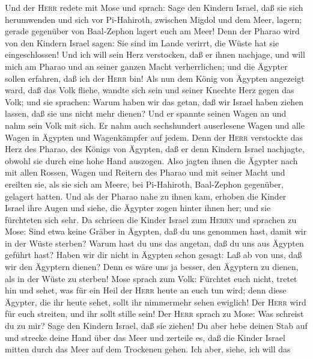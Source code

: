  Und der \textsc{Herr} redete mit Mose und sprach:
 Sage den Kindern Israel, daß sie sich herumwenden und
sich vor Pi-Hahiroth, zwischen Migdol und dem Meer, lagern; gerade
gegenüber von Baal-Zephon lagert euch am Meer!  Denn der
Pharao wird von den Kindern Israel sagen: Sie sind im Lande verirrt, die
Wüste hat sie eingeschlossen!  Und ich will sein Herz
verstocken, daß er ihnen nachjage, und will mich am Pharao und an seiner
ganzen Macht verherrlichen; und die Ägypter sollen erfahren, daß ich der
\textsc{Herr} bin!  Als nun dem König von Ägypten
angezeigt ward, daß das Volk fliehe, wandte sich sein und seiner Knechte
Herz gegen das Volk; und sie sprachen: Warum haben wir das getan, daß
wir Israel haben ziehen lassen, daß sie uns nicht mehr dienen?
 Und er spannte seinen Wagen an und nahm sein Volk mit
sich.  Er nahm auch sechshundert auserlesene Wagen und
alle Wagen in Ägypten und Wagenkämpfer auf jedem.  Denn
der \textsc{Herr} verstockte das Herz des Pharao, des Königs von
Ägypten, daß er denn Kindern Israel nachjagte, obwohl sie durch eine
hohe Hand auszogen.  Also jagten ihnen die Ägypter nach
mit allen Rossen, Wagen und Reitern des Pharao und mit seiner Macht und
ereilten sie, als sie sich am Meere, bei Pi-Hahiroth, Baal-Zephon
gegenüber, gelagert hatten.  Und als der Pharao nahe zu
ihnen kam, erhoben die Kinder Israel ihre Augen und siehe, die Ägypter
zogen hinter ihnen her; und sie fürchteten sich sehr. Da schrieen die
Kinder Israel zum \textsc{Herrn}  und sprachen zu Mose:
Sind etwa keine Gräber in Ägypten, daß du uns genommen hast, damit wir
in der Wüste sterben? Warum hast du uns das angetan, daß du uns aus
Ägypten geführt hast?  Haben wir dir nicht in Ägypten
schon gesagt: Laß ab von uns, daß wir den Ägyptern dienen? Denn es wäre
uns ja besser, den Ägyptern zu dienen, als in der Wüste zu sterben!
 Mose sprach zum Volk: Fürchtet euch nicht, tretet hin
und sehet, was für ein Heil der \textsc{Herr} heute an euch tun wird;
denn diese Ägypter, die ihr heute sehet, sollt ihr nimmermehr sehen
ewiglich!  Der \textsc{Herr} wird für euch streiten, und
ihr sollt stille sein!  Der \textsc{Herr} sprach zu Mose:
Was schreist du zu mir? Sage den Kindern Israel, daß sie ziehen!
 Du aber hebe deinen Stab auf und strecke deine Hand über
das Meer und zerteile es, daß die Kinder Israel mitten durch das Meer
auf dem Trockenen gehen.  Ich aber, siehe, ich will das
